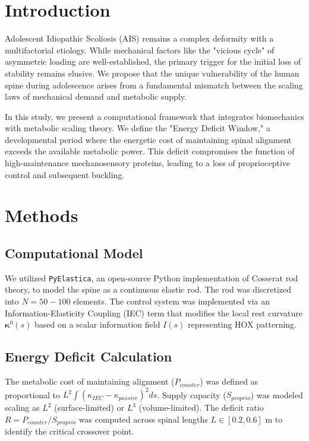 \documentclass[11pt]{article}
\begin{document}
\vspace{1em}

\section*{Introduction}

Adolescent Idiopathic Scoliosis (AIS) remains a complex deformity with a multifactorial etiology\cite{cheng2015}. While mechanical factors like the "vicious cycle" of asymmetric loading are well-established, the primary trigger for the initial loss of stability remains elusive. We propose that the unique vulnerability of the human spine during adolescence arises from a fundamental mismatch between the scaling laws of mechanical demand and metabolic supply.

In this study, we present a computational framework that integrates biomechanics with metabolic scaling theory. We define the "Energy Deficit Window," a developmental period where the energetic cost of maintaining spinal alignment exceeds the available metabolic power. This deficit compromises the function of high-maintenance mechanosensory proteins, leading to a loss of proprioceptive control and subsequent buckling.

\section*{Methods}

\subsection*{Computational Model}
We utilized \texttt{PyElastica}\cite{tekinalp2023}, an open-source Python implementation of Cosserat rod theory, to model the spine as a continuous elastic rod. The rod was discretized into $N=50-100$ elements. The control system was implemented via an Information-Elasticity Coupling (IEC) term that modifies the local rest curvature $\bm{\kappa}^0(s)$ based on a scalar information field $I(s)$ representing HOX patterning.

\subsection*{Energy Deficit Calculation}
The metabolic cost of maintaining alignment ($P_{counter}$) was defined as proportional to $L^2 \int (\kappa_{IEC} - \kappa_{passive})^2 ds$. Supply capacity ($S_{proprio}$) was modeled scaling as $L^2$ (surface-limited) or $L^3$ (volume-limited). The deficit ratio $R = P_{counter} / S_{proprio}$ was computed across spinal lengths $L \in [0.2, 0.6]$ m to identify the critical crossover point.
\end{document}
